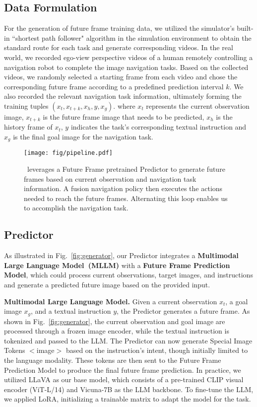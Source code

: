 \subsection{Data Formulation}
\label{sec_data}
For the generation of future frame training data, we utilized the simulator's built-in ``shortest path follower" algorithm in the simulation environment to obtain the standard route for each task and generate corresponding videos. 
%
In the real world, we recorded ego-view perspective videos of a human remotely controlling a navigation robot to complete the image navigation tasks.
%
Based on the collected videos, we randomly selected a starting frame from each video and chose the corresponding future frame according to a predefined prediction interval $k$. 
%
We also recorded the relevant navigation task information, ultimately forming the training tuples $(x_t, x_{t+k}, x_h, y, x_g)$.
%
where $x_t$ represents the current observation image, $x_{t+k}$ is the future frame image that needs to be predicted, $x_h$ is the history frame of $x_t$, $y$ indicates the task's corresponding textual instruction and $x_g$ is the final goal image for the navigation task.


\begin{figure*}[t]
    \centering
    \texttt{[image: fig/pipeline.pdf]}
    \caption{\textbf{\mname} ~leverages a Future Frame pretrained Predictor to generate future frames based on current observation and navigation task information. A fusion navigation policy then executes the actions needed to reach the future frames. Alternating this loop enables us to accomplish the navigation task.}
    \label{fig:pipeline}
\end{figure*}


\subsection{Predictor}

As illustrated in Fig.~\ref{fig:generator}, our Predictor integrates a \textbf{Multimodal Large Language Model~(MLLM)} with a \textbf{Future Frame Prediction Model}, which could process current observations, target images, and instructions and generate a predicted future image based on the provided input.

 \textbf{Multimodal Large Language Model.} 
Given a current observation $x_t$, a goal image $x_g$, and a textual instruction $y$, the Predictor generates a future frame. 
%
As shown in Fig.~\ref{fig:generator}, the current observation and goal image are processed through a frozen image encoder, while the textual instruction is tokenized and passed to the LLM. 
%
The Predictor can now generate Special Image Tokens $<$image$>$ based on the instruction's intent, though initially limited to the language modality. 
%
These tokens are then sent to the Future Frame Prediction Model to produce the final future frame prediction.
%
In practice, we utilized LLaVA as our base model, which consists of a pre-trained CLIP visual encoder (ViT-L/14) and Vicuna-7B as the LLM backbone. 
%
To fine-tune the LLM, we applied LoRA, initializing a trainable matrix to adapt the model for the task.

